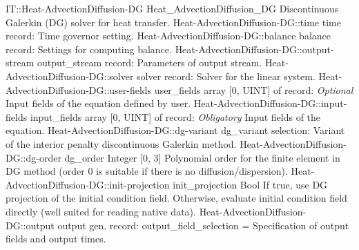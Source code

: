 \begin{RecordType}
	{IT::Heat-AdvectionDiffusion-DG}
	{Heat{\_}AdvectionDiffusion{\_}DG}
	{}%
	{}%
	{{{Discontinuous Galerkin (DG) solver for heat transfer.}%
}}
		\RecKey
			{Heat-AdvectionDiffusion-DG::time}
			{time}
			{{record: }}{}
			{ \ValueDefault{{\{}{\}}}}
			{{{Time governor setting.}%
}}
		\RecKey
			{Heat-AdvectionDiffusion-DG::balance}
			{balance}
			{{record: }}{}
			{ \ValueDefault{{\{}{\}}}}
			{{{Settings for computing balance.}%
}}
		\RecKey
			{Heat-AdvectionDiffusion-DG::output-stream}
			{output{\_}stream}
			{{record: }}{}
			{ \ValueDefault{{\{}{\}}}}
			{{{Parameters of output stream.}%
}}
		\RecKey
			{Heat-AdvectionDiffusion-DG::solver}
			{solver}
			{{record: }}{}
			{ \ValueDefault{{\{}{\}}}}
			{{{Solver for the linear system.}%
}}
		\RecKey
			{Heat-AdvectionDiffusion-DG::user-fields}
			{user{\_}fields}
			{{array [0, UINT] of }{record: }}{}
			{ \it{Optional}}
			{{{Input fields of the equation defined by user.}%
}}
		\RecKey
			{Heat-AdvectionDiffusion-DG::input-fields}
			{input{\_}fields}
			{{array [0, UINT] of }{record: }}{}
			{ \it{Obligatory}}
			{{{Input fields of the equation.}%
}}
		\RecKey
			{Heat-AdvectionDiffusion-DG::dg-variant}
			{dg{\_}variant}
			{{selection: }}{}
			{ }
			{{{Variant of the interior penalty discontinuous Galerkin method.}%
}}
		\RecKey
			{Heat-AdvectionDiffusion-DG::dg-order}
			{dg{\_}order}
			{{Integer [0, 3]}}{}
			{ }
			{{{Polynomial order for the finite element in DG method (order 0 is suitable if there is no diffusion/dispersion).}%
}}
		\RecKey
			{Heat-AdvectionDiffusion-DG::init-projection}
			{init{\_}projection}
			{{Bool}}{}
			{ }
			{{{If true, use DG projection of the initial condition field.
Otherwise, evaluate initial condition field directly (well suited for reading native data).}%
}}
		\RecKey
			{Heat-AdvectionDiffusion-DG::output}
			{output}
			{{gen. record: }}{{output{\_}field{\_}selection}{ = }}
			{ }
			{{{Specification of output fields and output times.}%
}}
\end{RecordType}
